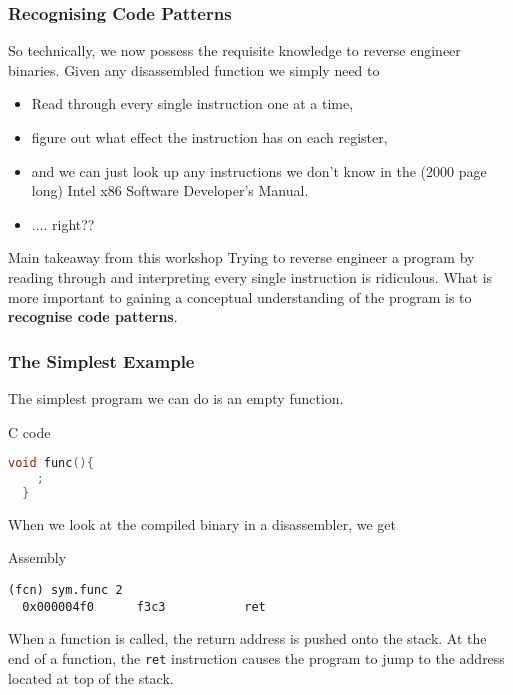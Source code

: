 \documentclass{beamer}
\begin{document}
\begin{frame}
  \frametitle{Recognising Code Patterns}
  So technically, we now possess the requisite knowledge to reverse engineer
  binaries. Given any disassembled function we simply need to
  \begin{itemize}
    \item Read through every single
    instruction one at a time,
    \item figure out what effect the instruction has on each register,
    \item and we can just look up any instructions we don't know in the (2000 page long) Intel x86 Software Developer's Manual.
    \item .... right??
  \end{itemize}

  \begin{alertblock}{Main takeaway from this workshop}
    Trying to reverse engineer a program by reading through and interpreting
    every single instruction is ridiculous. What is more important to gaining
    a conceptual understanding of the program is to \textbf{recognise code patterns}.
  \end{alertblock}
\end{frame}

\begin{frame}[fragile]
  \frametitle{The Simplest Example}
  The simplest program we can do is an empty function.
  \begin{block}{C code}
  \begin{lstlisting}[language=C, basicstyle=\small\ttfamily]
  void func(){
    ;
  }
  \end{lstlisting}
\end{block}
When we look at the compiled binary in a disassembler, we get
\begin{block}{Assembly}
  \begin{lstlisting}[basicstyle=\small\ttfamily, language={[x86masm]Assembler}]
(fcn) sym.func 2
  0x000004f0      f3c3           ret
\end{lstlisting}
\end{block}
When a function is called, the return address is pushed onto the stack.
At the end of a function, the \texttt{ret} instruction causes the program to jump
to the address located at top of the stack.
\end{frame}
\end{document}
